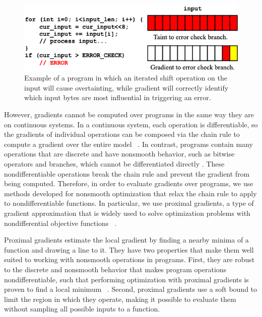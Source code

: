 \begin{figure}
  \centering
  \includegraphics[width=\linewidth]{figs/sosp-grad_v_taint_ex}
  \vspace{-25pt}
  \caption{\label{fig:taint_v_gradient} Example of a program in which an iterated shift operation on the input will cause overtainting, while gradient will correctly identify which input bytes are most influential in triggering an error. }
  \vspace{-15pt}
\end{figure}

However, gradients cannot be computed over programs in the same way they are on continuous systems. In a continuous system, each operation is differentiable, so the gradients of individual operations can be composed via the chain rule to compute a gradient over the entire model ~\cite{Wengert:1964:SAD:355586.364791}. In contrast, programs contain many operations that are discrete and have nonsmooth behavior, such as bitwise operators and branches, which cannot be differentiated directly . These nondifferentiable operations break the chain rule and prevent the gradient from being computed. Therefore, in order to evaluate gradients over programs, we use methods developed for nonsmooth optimization that relax the chain rule to apply to nondifferentiable functions. In particular, we use proximal gradients, a type of gradient approximation that is widely used to solve optimization problems with nondifferential objective functions ~\cite{parikh2014proximal}. 

Proximal gradients estimate the local gradient by finding a nearby minima of a function and drawing a line to it. They have two properties that make them well suited to working with nonsmooth operations in programs. First, they are robust to the discrete and nonsmooth behavior that makes program operations nondifferentiable, such that performing optimization with proximal gradients is proven to find a local minimum ~\cite{bertsekas2015convex}. Second, proximal gradients use a soft bound to limit the region in which they operate, making it possible to evaluate them without sampling all possible inputs to a function. 

